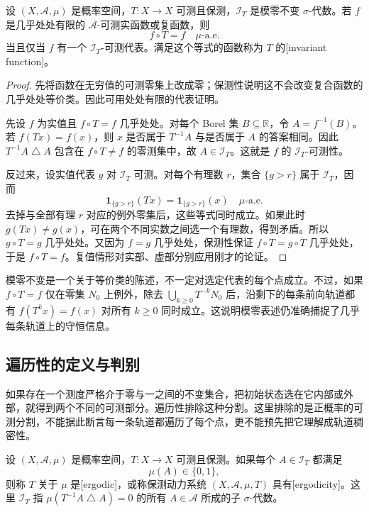 \begin{proposition}[不变函数的可测性刻画]\label{b1:prop:invariant-functions-32}
设 \((X,\mathcal A,\mu)\) 是概率空间，\(T\colon X\rightarrow X\) 可测且保测，\(\mathcal I_T\) 是模零不变 \(\sigma\)-代数。若 \(f\) 是几乎处处有限的 \(\mathcal A\)-可测实函数或复函数，则
\[
 f\circ T=f\quad\mu\text{-a.e.}
\]
当且仅当 \(f\) 有一个 \(\mathcal I_T\)-可测代表。满足这个等式的函数称为 \(T\) 的[invariant function]。
\end{proposition}
\begin{proof}
先将函数在无穷值的可测零集上改成零；保测性说明这不会改变复合函数的几乎处处等价类。因此可用处处有限的代表证明。

先设 \(f\) 为实值且 \(f\circ T=f\) 几乎处处。对每个 Borel 集 \(B\subseteq\mathbb R\)，令 \(A=f^{-1}(B)\)。若 \(f(Tx)=f(x)\)，则 \(x\) 是否属于 \(T^{-1}A\) 与是否属于 \(A\) 的答案相同。因此 \(T^{-1}A\mathbin{\triangle}A\) 包含在 \(f\circ T\ne f\) 的零测集中，故 \(A\in\mathcal I_T\)。这就是 \(f\) 的 \(\mathcal I_T\)-可测性。

反过来，设实值代表 \(g\) 对 \(\mathcal I_T\) 可测。对每个有理数 \(r\)，集合 \(\{g>r\}\) 属于 \(\mathcal I_T\)，因而
\[
 \mathbf1_{\{g>r\}}(Tx)=\mathbf1_{\{g>r\}}(x)
 \quad\mu\text{-a.e.}
\]
去掉与全部有理 \(r\) 对应的例外零集后，这些等式同时成立。如果此时 \(g(Tx)\ne g(x)\)，可在两个不同实数之间选一个有理数，得到矛盾。所以 \(g\circ T=g\) 几乎处处。又因为 \(f=g\) 几乎处处，保测性保证 \(f\circ T=g\circ T\) 几乎处处，于是 \(f\circ T=f\)。复值情形对实部、虚部分别应用刚才的论证。
\end{proof}

模零不变是一个关于等价类的陈述，不一定对选定代表的每个点成立。不过，如果 \(f\circ T=f\) 仅在零集 \(N_0\) 上例外，除去 \(\bigcup_{k\geq0}T^{-k}N_0\) 后，沿剩下的每条前向轨道都有 \(f(T^kx)=f(x)\) 对所有 \(k\geq0\) 同时成立。这说明模零表述仍准确捕捉了几乎每条轨道上的守恒信息。

\subsection{遍历性的定义与判别}
\label{b1:subsec:320103}

如果存在一个测度严格介于零与一之间的不变集合，把初始状态选在它内部或外部，就得到两个不同的可测部分。遍历性排除这种分割。这里排除的是正概率的可测分割，不能据此断言每一条轨道都遍历了每个点，更不能预先把它理解成轨道稠密性。

\begin{definition}\label{b1:def:ergodic-32}
设 \((X,\mathcal A,\mu)\) 是概率空间，\(T\colon X\rightarrow X\) 可测且保测。如果每个 \(A\in\mathcal I_T\) 都满足
\[
 \mu(A)\in\{0,1\},
\]
则称 \(T\) 关于 \(\mu\) 是[ergodic]，或称保测动力系统 \((X,\mathcal A,\mu,T)\) 具有[ergodicity]。这里 \(\mathcal I_T\) 指 \(\mu(T^{-1}A\mathbin{\triangle}A)=0\) 的所有 \(A\in\mathcal A\) 所成的子 \(\sigma\)-代数。
\end{definition}

